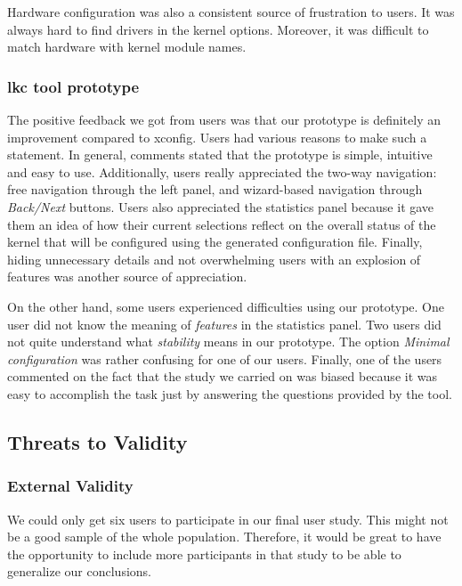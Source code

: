 \documentclass{chi2009}
\begin{document}
Hardware configuration was also a consistent source of frustration to users. It was always hard to find drivers in the kernel options. Moreover, it was
difficult to match hardware with kernel module names.

\subsubsection{\textsf{lkc tool prototype}}
The positive feedback we got from users was that our prototype is definitely an improvement compared to \textsf{xconfig}. Users had various reasons to make such
a statement. In general, comments stated that the prototype is simple, intuitive and easy to use. Additionally, users really appreciated the two-way navigation:
free navigation through the left panel, and wizard-based navigation through \textit{Back/Next} buttons. Users also appreciated the statistics panel because it
gave them an idea of how their current selections reflect on the overall status of the kernel that will be configured using the generated configuration file.
Finally, hiding unnecessary details and not overwhelming users with an explosion of features was another source of appreciation.

On the other hand, some users experienced difficulties using our prototype. One user did not know the meaning of \textit{features} in the statistics panel. Two
users did not quite understand what \textit{stability} means in our prototype. The option \textit{Minimal configuration} was rather confusing for one of our
users. Finally, one of the users commented on the fact that the study we carried on was biased because it was easy to accomplish the task just by answering the
questions provided by the tool.

\subsection{Threats to Validity}

\subsubsection{External Validity}
We could only get six users to participate in our final user study. This might not be a good sample of the whole population. Therefore, it would be great to
have the opportunity to include more participants in that study to be able to generalize our conclusions.
\end{document}
